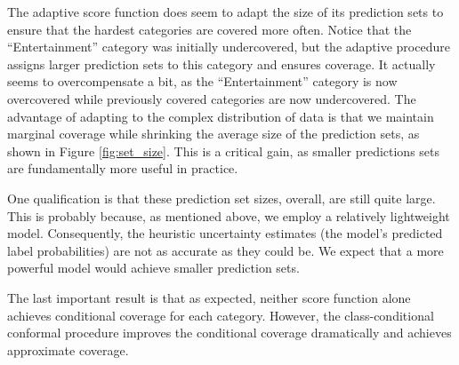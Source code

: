 \documentclass[a4paper, 12pt]{article}
\begin{document}
The adaptive score function does seem to adapt the size of its prediction sets to ensure that the hardest categories are covered more often. Notice that the ``Entertainment'' category was initially undercovered, but the adaptive procedure assigns larger prediction sets to this category and ensures coverage. It actually seems to overcompensate a bit, as the ``Entertainment'' category is now overcovered while previously covered categories are now undercovered. The advantage of adapting to the complex distribution of data is that we maintain marginal coverage while shrinking the average size of the prediction sets, as shown in Figure \ref{fig:set_size}. This is a critical gain, as smaller predictions sets are fundamentally more useful in practice.

One qualification is that these prediction set sizes, overall, are still quite large. This is probably because, as mentioned above, we employ a relatively lightweight model. Consequently, the heuristic uncertainty estimates (the model's predicted label probabilities) are not as accurate as they could be. We expect that a more powerful model would achieve smaller prediction sets.

The last important result is that as expected, neither score function alone achieves conditional coverage for each category. However, the class-conditional conformal procedure improves the conditional coverage dramatically and achieves approximate coverage.
\end{document}
